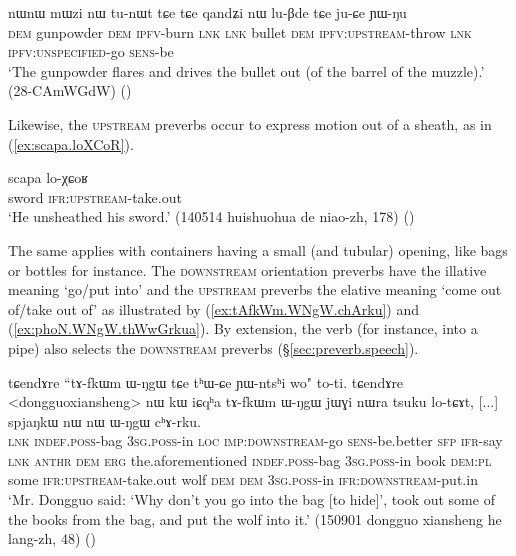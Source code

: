 \begin{exe}
\ex \label{ex:qandZi.luBde}
\gll nɯnɯ mɯzi nɯ tu-nɯt tɕe tɕe qandʑi nɯ lu-βde tɕe ju-ɕe ɲɯ-ŋu \\
\textsc{dem} gunpowder \textsc{dem} \textsc{ipfv}-burn \textsc{lnk} \textsc{lnk} bullet \textsc{dem} \textsc{ipfv}:\textsc{upstream}-throw \textsc{lnk} \textsc{ipfv}:\textsc{unspecified}-go \textsc{sens}-be \\
\glt `The gunpowder flares and drives the bullet out (of the barrel of the muzzle).' (28-CAmWGdW)
()
\end{exe}

Likewise, the \textsc{upstream} preverbs occur to express motion out of a sheath, as in (\ref{ex:scapa.loXCoR}).

\begin{exe}
\ex \label{ex:scapa.loXCoR}
\gll  scapa lo-χɕoʁ \\
sword \textsc{ifr}:\textsc{upstream}-take.out  \\
\glt `He unsheathed his sword.' (140514 huishuohua de niao-zh, 178) ()
\end{exe}

The same applies with containers having a small (and tubular) opening, like bags or bottles for instance. The \textsc{downstream} orientation preverbs have the illative meaning `go/put into' and the \textsc{upstream} preverbs the elative meaning `come out of/take out of' as illustrated by (\ref{ex:tAfkWm.WNgW.chArku}) and  (\ref{ex:phoN.WNgW.thWwGrkua}). By extension, the verb  (for instance, into a pipe) also selects the \textsc{downstream} preverbs (§\ref{sec:preverb.speech}).

\begin{exe}
\ex \label{ex:tAfkWm.WNgW.chArku}
\gll  tɕendɤre ``tɤ-fkɯm ɯ-ŋgɯ tɕe tʰɯ-ɕe ɲɯ-ntsʰi wo" to-ti. tɕendɤre <dongguoxiansheng> nɯ kɯ iɕqʰa tɤ-fkɯm ɯ-ŋgɯ jɯɣi nɯra tsuku lo-tɕɤt, [...] spjaŋkɯ nɯ nɯ ɯ-ŋgɯ cʰɤ-rku. \\
\textsc{lnk}  \textsc{indef}.\textsc{poss}-bag \textsc{3sg}.\textsc{poss}-in \textsc{loc} \textsc{imp}:\textsc{downstream}-go \textsc{sens}-be.better \textsc{sfp} \textsc{ifr}-say \textsc{lnk}  \textsc{anthr} \textsc{dem} \textsc{erg} the.aforementioned  \textsc{indef}.\textsc{poss}-bag \textsc{3sg}.\textsc{poss}-in book \textsc{dem}:\textsc{pl} some \textsc{ifr}:\textsc{upstream}-take.out { } wolf \textsc{dem} \textsc{dem}  \textsc{3sg}.\textsc{poss}-in \textsc{ifr}:\textsc{downstream}-put.in \\
\glt `Mr. Dongguo said: `Why don't you go into the bag [to hide]', took out some of the books from the bag, and put the wolf into it.' (150901 dongguo xiansheng he lang-zh, 48)
()
\end{exe}

